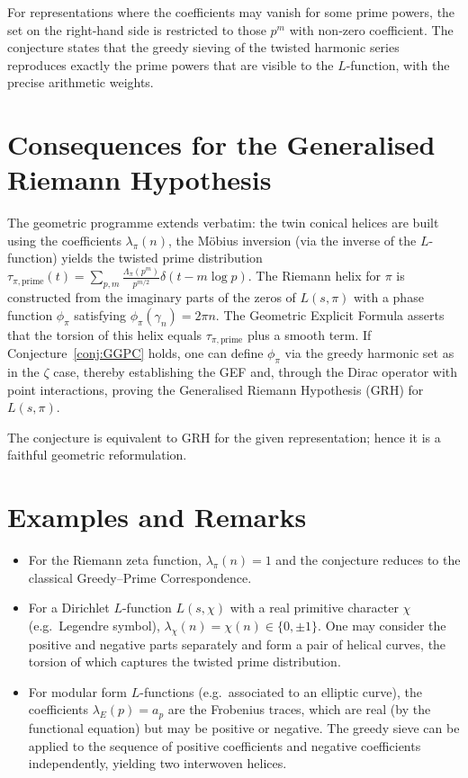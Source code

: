 \documentclass[12pt,a4paper]{article}
\begin{document}
For representations where the coefficients may vanish for some prime powers, the set on the right‑hand side is restricted to those \(p^m\) with non‑zero coefficient.  The conjecture states that the greedy sieving of the twisted harmonic series reproduces exactly the prime powers that are visible to the \(L\)-function, with the precise arithmetic weights.

\section{Consequences for the Generalised Riemann Hypothesis}
The geometric programme extends verbatim: the twin conical helices are built using the coefficients \(\lambda_\pi(n)\), the Möbius inversion (via the inverse of the \(L\)-function) yields the twisted prime distribution \(\tau_{\pi,\mathrm{prime}}(t)=\sum_{p,m}\frac{\Lambda_\pi(p^m)}{p^{m/2}}\delta(t-m\log p)\).  The Riemann helix for \(\pi\) is constructed from the imaginary parts of the zeros of \(L(s,\pi)\) with a phase function \(\phi_\pi\) satisfying \(\phi_\pi(\gamma_n)=2\pi n\).  The Geometric Explicit Formula asserts that the torsion of this helix equals \(\tau_{\pi,\mathrm{prime}}\) plus a smooth term.  If Conjecture~\ref{conj:GGPC} holds, one can define \(\phi_\pi\) via the greedy harmonic set as in the \(\zeta\) case, thereby establishing the GEF and, through the Dirac operator with point interactions, proving the Generalised Riemann Hypothesis (GRH) for \(L(s,\pi)\).

The conjecture is equivalent to GRH for the given representation; hence it is a faithful geometric reformulation.

\section{Examples and Remarks}
\begin{itemize}
\item For the Riemann zeta function, \(\lambda_\pi(n)=1\) and the conjecture reduces to the classical Greedy--Prime Correspondence.
\item For a Dirichlet \(L\)-function \(L(s,\chi)\) with a real primitive character \(\chi\) (e.g.\ Legendre symbol), \(\lambda_\chi(n)=\chi(n)\in\{0,\pm1\}\).  One may consider the positive and negative parts separately and form a pair of helical curves, the torsion of which captures the twisted prime distribution.
\item For modular form \(L\)-functions (e.g.\ associated to an elliptic curve), the coefficients \(\lambda_E(p)=a_p\) are the Frobenius traces, which are real (by the functional equation) but may be positive or negative.  The greedy sieve can be applied to the sequence of positive coefficients and negative coefficients independently, yielding two interwoven helices.
\end{itemize}
\end{document}
